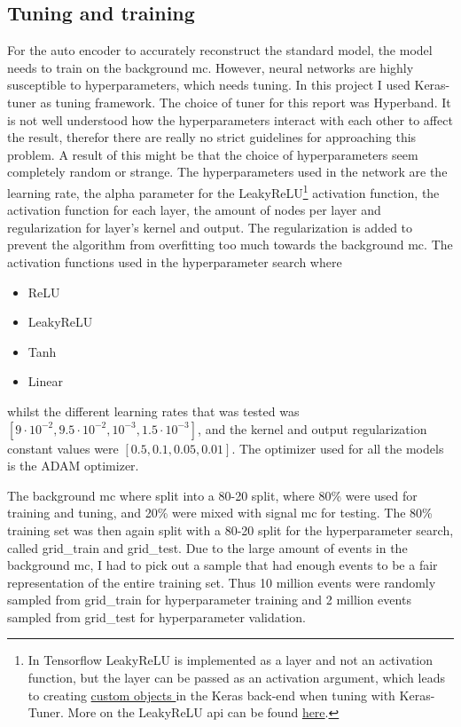 \documentclass[ reprint, amsmath,amssymb, aps, nofootinbib]{revtex4-2}
\begin{document}
 

\subsection{Tuning and training}
For the auto encoder to accurately reconstruct the standard model, the model needs to train on the background mc. However, neural networks are highly susceptible to hyperparameters, which needs tuning. In this project I used Keras-tuner\cite{omalley2019kerastuner} as tuning framework. The choice of tuner for this report was Hyperband\cite{JMLR:v18:16-558}. It is not well understood how the hyperparameters interact with each other to affect the result, therefor there are really no strict guidelines for approaching this problem. A result of this might be that the choice of hyperparameters seem completely random or strange. The hyperparameters used in the network are the learning rate, the alpha parameter for the LeakyReLU\footnote{In Tensorflow LeakyReLU is implemented as a layer and not an activation function, but the layer can be passed as an activation argument, which leads to creating \href{https://www.tensorflow.org/api_docs/python/tf/keras/utils/get_custom_objects}{custom objects } in the Keras back-end when tuning with Keras-Tuner. More on the LeakyReLU api can be found \href{https://www.tensorflow.org/api_docs/python/tf/keras/layers/LeakyReLU}{here}.} activation function, the activation function for each layer, the amount of nodes per layer and regularization for layer's kernel and output. The regularization is added to prevent the algorithm from overfitting too much towards the background mc. The activation functions used in the hyperparameter search where
\begin{itemize}
    \item ReLU
    \item LeakyReLU
    \item Tanh
    \item Linear
\end{itemize}
whilst the different learning rates that was tested was $[9\cdot 10^{-2}, 9.5\cdot 10^{-2}, 10^{-3}, 1.5\cdot 10^{-3}]$, and the kernel and output regularization constant values were $[0.5, 0.1, 0.05, 0.01]$. The optimizer used for all the models is the ADAM\cite{https://doi.org/10.48550/arxiv.1412.6980} optimizer. \par \par 
The background mc where split into a 80-20 split, where 80\% were used for training and tuning, and 20\% were mixed with signal mc for testing. The 80\% training set was then again split with a 80-20 split for the hyperparameter search, called grid\_train and grid\_test. Due to the large amount of events in the background mc, I had to pick out a sample that had enough events to be a fair representation of the entire training set. Thus 10 million events were randomly sampled from grid\_train for hyperparameter training and 2 million events sampled from grid\_test for hyperparameter validation. \par 
\end{document}
